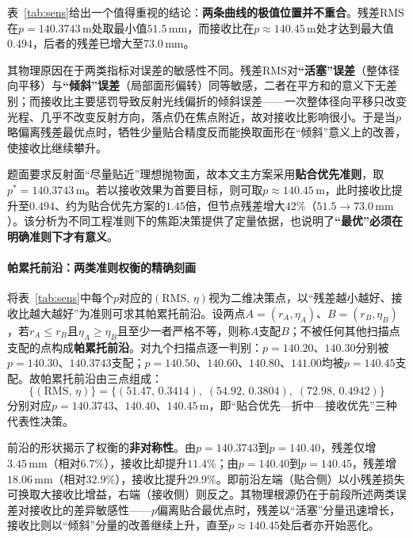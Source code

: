 \documentclass[withoutpreface]{cumcmthesis}
\begin{document}
表~\ref{tab:sens}给出一个值得重视的结论：\textbf{两条曲线的极值位置并不重合}。残差$\mathrm{RMS}$在$p=140.3743\,\mathrm{m}$处取最小值$51.5\,\mathrm{mm}$，而接收比在$p\approx140.45\,\mathrm{m}$处才达到最大值$0.494$，后者的残差已增大至$73.0\,\mathrm{mm}$。

其物理原因在于两类指标对误差的敏感性不同。残差$\mathrm{RMS}$对\textbf{``活塞''误差}（整体径向平移）与\textbf{``倾斜''误差}（局部面形偏转）同等敏感，二者在平方和的意义下无差别；而接收比主要惩罚导致反射光线偏折的倾斜误差——一次整体径向平移只改变光程、几乎不改变反射方向，落点仍在焦点附近，故对接收比影响很小。于是当$p$略偏离残差最优点时，牺牲少量贴合精度反而能换取面形在``倾斜''意义上的改善，使接收比继续攀升。

题面要求反射面``尽量贴近''理想抛物面，故本文主方案采用\textbf{贴合优先准则}，取$p^{*}=140.3743\,\mathrm{m}$。若以接收效果为首要目标，则可取$p\approx140.45\,\mathrm{m}$，此时接收比提升至$0.494$、约为贴合优先方案的$1.45$倍，但节点残差增大$42\%$（$51.5\to73.0\,\mathrm{mm}$）。该分析为不同工程准则下的焦距决策提供了定量依据，也说明了\textbf{``最优''必须在明确准则下才有意义}。

\paragraph{帕累托前沿：两类准则权衡的精确刻画}\label{sec:pareto}

将表~\ref{tab:sens}中每个$p$对应的$(\mathrm{RMS},\,\eta)$视为二维决策点，以``残差越小越好、接收比越大越好''为准则可求其帕累托前沿。设两点$A=(r_A,\eta_A)$、$B=(r_B,\eta_B)$，若$r_A\le r_B$且$\eta_A\ge\eta_B$且至少一者严格不等，则称$A$支配$B$；不被任何其他扫描点支配的点构成\textbf{帕累托前沿}。对九个扫描点逐一判别：$p=140.20$、$140.30$分别被$p=140.30$、$140.3743$支配；$p=140.50$、$140.60$、$140.80$、$141.00$均被$p=140.45$支配。故帕累托前沿由三点组成：
\begin{equation}\label{eq:pareto}
\bigl\{(\mathrm{RMS},\,\eta)\bigr\}
=\bigl\{(51.47,\,0.3414),\;(54.92,\,0.3804),\;(72.98,\,0.4942)\bigr\}
\end{equation}
分别对应$p=140.3743$、$140.40$、$140.45\,\mathrm{m}$，即``贴合优先—折中—接收优先''三种代表性决策。

前沿的形状揭示了权衡的\textbf{非对称性}。由$p=140.3743$到$p=140.40$，残差仅增$3.45\,\mathrm{mm}$（相对$6.7\%$），接收比却提升$11.4\%$；由$p=140.40$到$p=140.45$，残差增$18.06\,\mathrm{mm}$（相对$32.9\%$），接收比提升$29.9\%$。即前沿左端（贴合侧）以小残差损失可换取大接收比增益，右端（接收侧）则反之。其物理根源仍在于前段所述两类误差对接收比的差异敏感性——$p$偏离贴合最优点时，残差以``活塞''分量迅速增长，接收比则以``倾斜''分量的改善继续上升，直至$p\approx140.45$处后者亦开始恶化。
\end{document}
